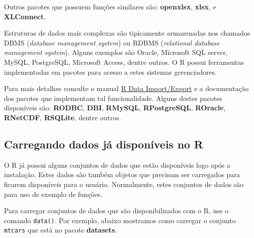 \documentclass[10pt,a4paper]{book}
\begin{document}
Outros pacotes que possuem funções similares são: \textbf{openxlsx},
\textbf{xlsx}, e \textbf{XLConnect}.

Estruturas de dados mais complexas são tipicamente armazenadas nos
chamados DBMS (\emph{database management system}) ou RDBMS
(\emph{relational database management system}). Alguns exemplos são
Oracle, Microsoft SQL server, MySQL, PostgreSQL, Microsoft Access,
dentre outros. O R possui ferramentas implementadas em pacotes para
acesso a estes sistemas gerenciadores.

Para mais detalhes consulte o manual
\href{http://cran-r.c3sl.ufpr.br/doc/manuals/r-release/R-data.html}{R
Data Import/Export} e a documentação dos pacotes que implementam tal
funcionalidade. Alguns destes pacotes disponíveis são: \textbf{RODBC},
\textbf{DBI}, \textbf{RMySQL}, \textbf{RPostgreSQL}, \textbf{ROracle},
\textbf{RNetCDF}, \textbf{RSQLite}, dentre outros.

\subsection{Carregando dados já disponíveis no
R}\label{carregando-dados-juxe1-disponuxedveis-no-r}

O R já possui alguns conjuntos de dados que estão disponíveis logo após
a instalação. Estes dados são também objetos que precisam ser carregados
para ficarem disponíveis para o usuário. Normalmente, estes conjuntos de
dados são para uso de exemplo de funções.

Para carregar conjuntos de dados que são disponibilizados com o R, use o
comando \texttt{data()}. Por exemplo, abaixo mostramos como carregar o
conjunto \texttt{mtcars} que está no pacote \textbf{datasets}.
\end{document}
